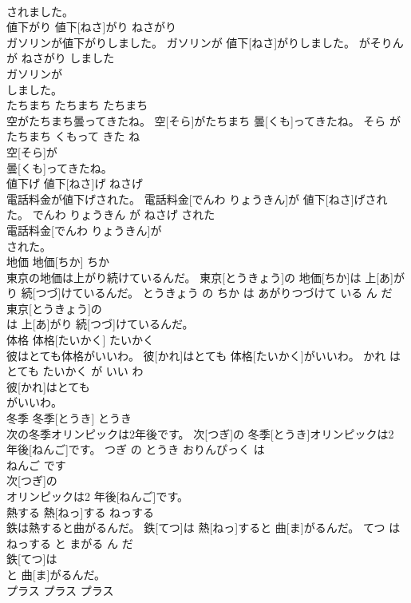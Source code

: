 \documentclass[8pt]{extreport}
\begin{document}
\begin{CJK}{UTF8}{min}
\\	されました。			
\\	値下がり	値下[ねさ]がり	ねさがり	
\\	ガソリンが値下がりしました。	ガソリンが 値下[ねさ]がりしました。	がそりん が ねさがり しました	
\\	ガソリンが
\\	しました。			
\\	たちまち	たちまち	たちまち	
\\	空がたちまち曇ってきたね。	空[そら]がたちまち 曇[くも]ってきたね。	そら が たちまち くもって きた ね	
\\	空[そら]が
\\	曇[くも]ってきたね。			
\\	値下げ	値下[ねさ]げ	ねさげ	
\\	電話料金が値下げされた。	電話料金[でんわ りょうきん]が 値下[ねさ]げされた。	でんわ りょうきん が ねさげ された	
\\	電話料金[でんわ りょうきん]が
\\	された。			
\\	地価	地価[ちか]	ちか	
\\	東京の地価は上がり続けているんだ。	東京[とうきょう]の 地価[ちか]は 上[あ]がり 続[つづ]けているんだ。	とうきょう の ちか は あがりつづけて いる ん だ	
\\	東京[とうきょう]の
\\	は 上[あ]がり 続[つづ]けているんだ。			
\\	体格	体格[たいかく]	たいかく	
\\	彼はとても体格がいいわ。	彼[かれ]はとても 体格[たいかく]がいいわ。	かれ は とても たいかく が いい わ	
\\	彼[かれ]はとても
\\	がいいわ。			
\\	冬季	冬季[とうき]	とうき	
\\	次の冬季オリンピックは2年後です。	次[つぎ]の 冬季[とうき]オリンピックは2 年後[ねんご]です。	つぎ の とうき おりんぴっく は 
\\	ねんご です	
\\	次[つぎ]の
\\	オリンピックは2 年後[ねんご]です。			
\\	熱する	熱[ねっ]する	ねっする	
\\	鉄は熱すると曲がるんだ。	鉄[てつ]は 熱[ねっ]すると 曲[ま]がるんだ。	てつ は ねっする と まがる ん だ	
\\	鉄[てつ]は
\\	と 曲[ま]がるんだ。			
\\	プラス	プラス	プラス	

\end{CJK}
\end{document}
